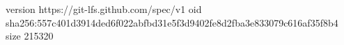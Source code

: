 version https://git-lfs.github.com/spec/v1
oid sha256:557c401d3914ded6f022abfbd31e5f3d9402fe8d2fba3e833079c616af35f8b4
size 215320
